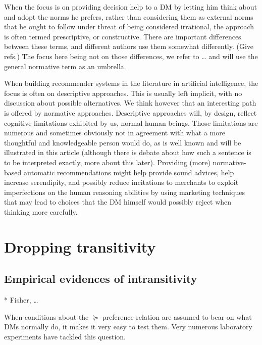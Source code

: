 \documentclass[french, english]{llncs}
\begin{document}
When the focus is on providing decision help to a \ac{DM} by letting him think about and adopt the norms he prefers, rather than considering them as external norms that he ought to follow under threat of being considered irrational, the approach is often termed prescriptive, or constructive. There are important differences between these terms, and different authors use them somewhat differently. (Give refs.) The focus here being not on those differences, we refer to … and will use the general normative term as an umbrella.

When building recommender systems in the literature in artificial intelligence, the focus is often on descriptive approaches. This is usually left implicit, with no discussion about possible alternatives. We think however that an interesting path is offered by normative approaches. Descriptive approaches will, by design, reflect cognitive limitations exhibited by us, normal human beings. Those limitations are numerous and sometimes obviously not in agreement with what a more thoughtful and knowledgeable person would do, as is well known and will be illustrated in this article (although there is debate about how such a sentence is to be interpreted exactly, more about this later). Providing (more) normative-based automatic recommendations might help provide sound advices, help increase serendipity, and possibly reduce incitations to merchants to exploit imperfections on the human reasoning abilities by using marketing techniques that may lead to choices that the \ac{DM} himself would possibly reject when thinking more carefully.

\section{Dropping transitivity}

\subsection{Empirical evidences of intransitivity}

* Fisher, \ldots {}

When conditions about the $\succeq$ preference relation are assumed to bear on what \acp{DM} normally do, it makes it very easy to test them. Very numerous laboratory experiments have tackled this question.
\end{document}
